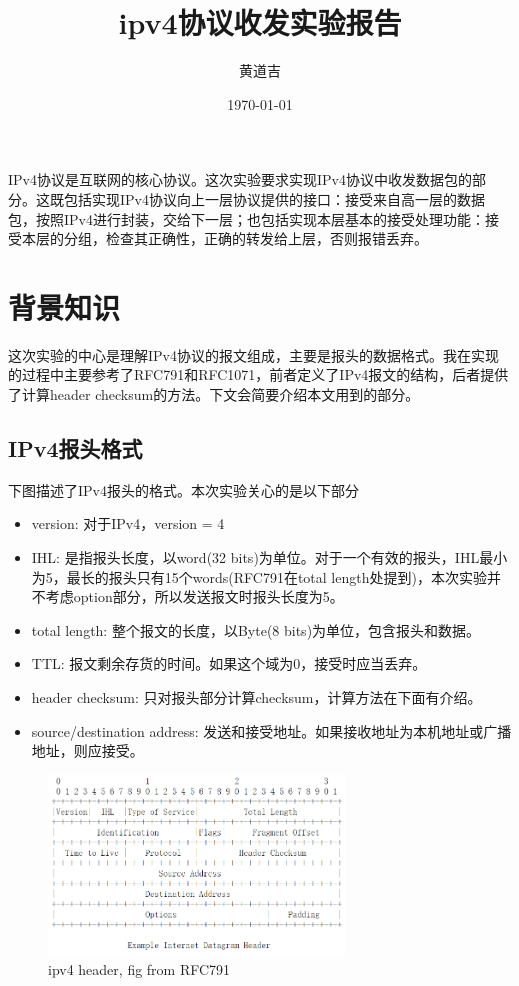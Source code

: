 \documentclass{article}
\author{黄道吉}
\title{ipv4协议收发实验报告}
\date{\today}
\begin{document}
\maketitle

IPv4协议是互联网的核心协议。这次实验要求实现IPv4协议中收发数据包的部分。这既包括实现IPv4协议向上一层协议提供的接口：接受来自高一层的数据包，按照IPv4进行封装，交给下一层；也包括实现本层基本的接受处理功能：接受本层的分组，检查其正确性，正确的转发给上层，否则报错丢弃。

\section{背景知识}

这次实验的中心是理解IPv4协议的报文组成，主要是报头的数据格式。我在实现的过程中主要参考了RFC791和RFC1071，前者定义了IPv4报文的结构，后者提供了计算header checksum的方法。下文会简要介绍本文用到的部分。

\subsection{IPv4报头格式}

下图描述了IPv4报头的格式。本次实验关心的是以下部分
\begin{itemize}
    \item version: 对于IPv4，version = 4
    \item IHL: 是指报头长度，以word(32 bits)为单位。对于一个有效的报头，IHL最小为5，最长的报头只有15个words(RFC791在total length处提到)，本次实验并不考虑option部分，所以发送报文时报头长度为5。
    \item total length: 整个报文的长度，以Byte(8 bits)为单位，包含报头和数据。
    \item TTL: 报文剩余存货的时间。如果这个域为0，接受时应当丢弃。
    \item header checksum: 只对报头部分计算checksum，计算方法在下面有介绍。
    \item source/destination address: 发送和接受地址。如果接收地址为本机地址或广播地址，则应接受。

\end{itemize}

\begin{figure}[H]
    \centering
    \includegraphics[width=0.7\textwidth]{header.png}
    \caption{ipv4 header, fig from RFC791}
    \label{1}
\end{figure}
\end{document}
